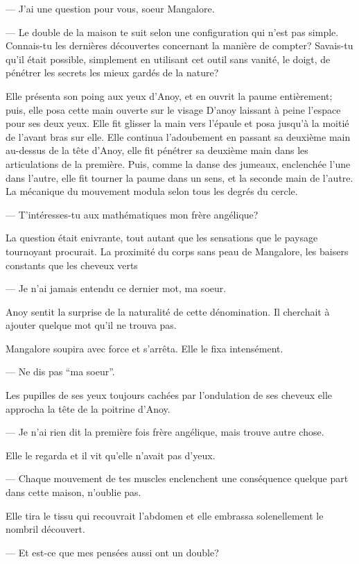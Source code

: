 --- J'ai une question pour vous, soeur Mangalore.

--- Le double de la maison te suit selon une configuration qui n'est
pas simple. Connais-tu les dernières découvertes concernant la manière
de compter? Savais-tu qu'il était possible, simplement en utilisant
cet outil sans vanité, le doigt, de pénétrer les secrets les mieux
gardés de la nature?

Elle présenta son poing aux yeux d'Anoy, et en ouvrit la paume
entièrement; puis, elle posa cette main ouverte sur le visage D'anoy
laissant à peine l'espace pour ses deux yeux. Elle fit glisser la main
vers l'épaule et posa jusqu'à la moitié de l'avant bras sur elle. Elle
continua l'adoubement en passant sa deuxième main au-dessus de la tête
d'Anoy, elle fit pénétrer sa deuxième main dans les articulations de
la première. Puis, comme la danse des jumeaux, enclenchée l'une dans
l'autre, elle fit tourner la paume dans un sens, et la seconde main de
l'autre. La mécanique du mouvement modula selon tous les degrés du
cercle.

--- T'intéresses-tu aux mathématiques mon frère angélique?

La question était enivrante, tout autant que les sensations que le
paysage tournoyant procurait. La proximité du corps sans peau de
Mangalore, les baisers constants que les cheveux verts

--- Je n'ai jamais entendu ce dernier mot, ma soeur.

Anoy sentit la surprise de la naturalité de cette dénomination. Il
cherchait à ajouter quelque mot qu'il ne trouva pas.

Mangalore soupira avec force et s'arrêta. Elle le fixa intensément.

--- Ne dis pas ``ma soeur''.

Les pupilles de ses yeux toujours cachées par l'ondulation de ses
cheveux elle approcha la tête de la poitrine d'Anoy.

--- Je n'ai rien dit la première fois frère angélique, mais trouve
autre chose. 

Elle le regarda et il vit qu'elle n'avait pas d'yeux.

--- Chaque mouvement de tes muscles enclenchent une conséquence
quelque part dans cette maison, n'oublie pas.

Elle tira le tissu qui recouvrait l'abdomen et elle embrassa
solenellement le nombril découvert.

--- Et est-ce que mes pensées aussi ont un double?

